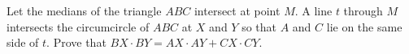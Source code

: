Let the medians of the triangle $ABC$ intersect at point $M$. A line $t$ through $M$ intersects the circumcircle of $ABC$ at $X$ and $Y$ so that $A$ and $C$ lie on the same side of $t$. Prove that $BX\cdot BY=AX\cdot AY+CX\cdot CY$.